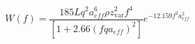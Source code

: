 $$W(f) = \frac{{185L{q^2}a_{eff}^6\rho z_{{\text{var}}}^2{f^4}}}{{[1 + 2.66{{(fq{a_{eff}})}^2}]}}{e^{ - 12.159{f^2}a_{eff}^2}}$$